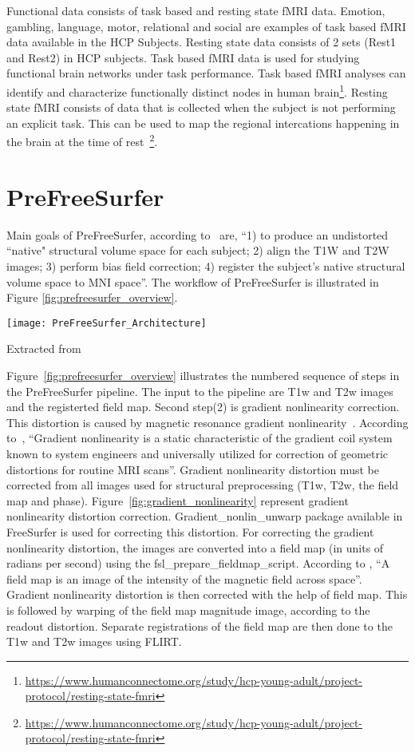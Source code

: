 Functional data consists of task based and resting state fMRI data. Emotion, gambling, language, motor, relational and social are examples of task based fMRI data available in the HCP Subjects. Resting state data consists of 2 sets (Rest1 and Rest2) in HCP subjects. Task based fMRI data is used for studying functional brain networks under task performance. Task based fMRI analyses can identify and characterize functionally distinct nodes in human brain\footnote{\url{https://www.humanconnectome.org/study/hcp-young-adult/project-protocol/resting-state-fmri}}. Resting state fMRI consists of data that is collected when the subject is not performing an explicit task. This can be used to map the regional intercations happening in the brain at the time of rest~\footnote{\url{https://www.humanconnectome.org/study/hcp-young-adult/project-protocol/resting-state-fmri}}.



\section{PreFreeSurfer} \label{sec:PrefreeSurfer}
Main goals of PreFreeSurfer, according to~\cite{Gla13} are, ``1) to produce an undistorted ``native" structural volume space for each subject; 2) align the T1W and T2W images; 3) perform bias field correction; 4) register the subject's native structural volume space to MNI space''. The workflow of PreFreeSurfer is illustrated in Figure \ref{fig:prefreesurfer_overview}.

\begin{center}
  \texttt{[image: PreFreeSurfer\_Architecture]}
  \label{fig:prefreesurfer_overview}
  \caption*{Extracted from \cite{Gla13}}
\end{center}

Figure~\ref{fig:prefreesurfer_overview} illustrates the numbered sequence of steps in the PreFreeSurfer pipeline. The input to the pipeline are T1w and T2w images and the registerted field map. Second step(2) is gradient nonlinearity correction. This distortion is caused by magnetic resonance gradient nonlinearity~\cite{Gla13}. According to~\cite{Zou2004}, ``Gradient nonlinearity is a static characteristic of the gradient coil system known to system engineers and universally utilized for correction of geometric distortions for routine MRI scans''. Gradient nonlinearity distortion must be corrected from all images used for structural preprocessing (T1w, T2w, the field map and phase). Figure~\ref{fig:gradient_nonlinearity} represent gradient nonlinearity distortion correction. Gradient\_nonlin\_unwarp package available in FreeSurfer is used for correcting this distortion. For correcting the gradient nonlinearity distortion, the images are converted into a field map (in units of radians per second) using the fsl\_prepare\_fieldmap\_script. According to \cite{field_map}, ``A field map is an image of the intensity of the magnetic field across space''. Gradient nonlinearity distortion is then corrected with the help of field map. This is followed by warping of the field map magnitude image, according to the readout distortion. Separate registrations of the field map are then done to the T1w and T2w images using FLIRT.

